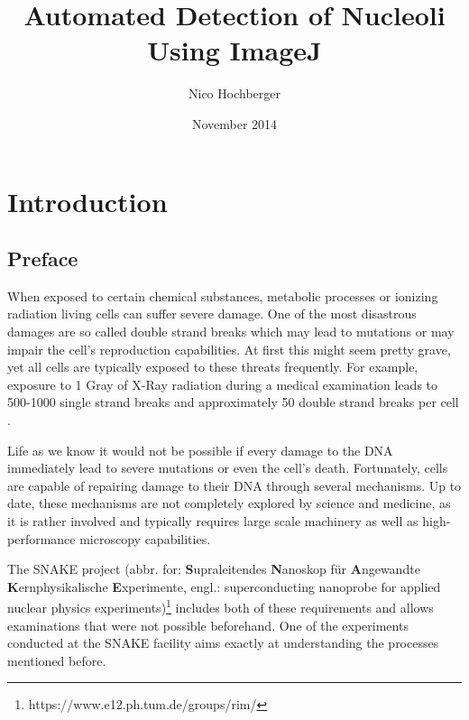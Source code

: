 \documentclass[a4paper, 12pt, twoside]{article}
\begin{document}

\nocite{*}

\title{Automated Detection of Nucleoli Using ImageJ}
\author{Nico Hochberger}
\date{November 2014}
\maketitle

\newpage
\thispagestyle{empty}
\mbox{}

\newpage
\renewcommand{\contentsname}{Table of Contents}
\tableofcontents

\newpage
{}
\listoffigures

\newpage
{}
\listoftables

\newpage
\section{Introduction}

\subsection{Preface}
When exposed to certain chemical substances, metabolic processes or ionizing
radiation living cells can suffer severe damage. One of the most disastrous
damages are so called double strand breaks which may lead to mutations or may
impair the cell's reproduction capabilities. At first this might seem pretty
grave, yet all cells are typically exposed to these threats frequently. For
example, exposure to 1 Gray of X-Ray radiation during a medical examination
leads to 500-1000 single strand breaks and approximately 50 double strand breaks
per cell \cite{sauer10}.

Life as we know it would not be possible if every damage to the DNA immediately
lead to severe mutations or even the cell's death. Fortunately, cells are
capable of repairing damage to their DNA through several mechanisms. Up to date,
these mechanisms are not completely explored by science and medicine, as it is
rather involved and typically requires large scale machinery as well as
high-performance microscopy capabilities.

The SNAKE project (abbr. for: \textbf{S}upraleitendes \textbf{N}anoskop
f\"{u}r \textbf{A}ngewandte \textbf{K}ernphysikalische \textbf{E}xperimente, engl.:
superconducting nanoprobe for applied nuclear physics
experiments)\footnote{https://www.e12.ph.tum.de/groups/rim/} includes both of these requirements and allows examinations that were not possible beforehand.
One of the experiments conducted at the SNAKE facility aims exactly at
understanding the processes mentioned before.
\end{document}
